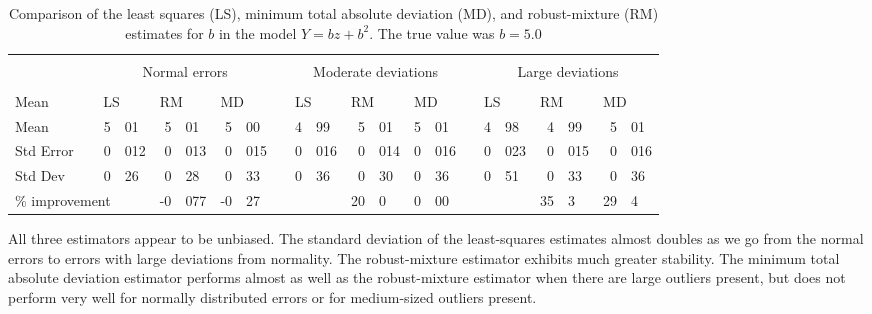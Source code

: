 \documentclass{admbmanual}
\begin{document}
\begin{table}[!h]
  \begin{tabular}{ l   *{3}{ c *{3}{r@{.}l } }     }
    \hline\\[-11pt]
    \hline\\[-9.0pt]
                   &&  \multicolumn{6}{c}{Normal errors}    && \multicolumn{6}{c}{Moderate deviations}    && \multicolumn{6}{c}{Large deviations}  %
                   \\[3pt]
                      \cline{3-8}\cline{10-15}\cline{17-22} \\[-6pt]
    Mean       &&  \multicolumn{2}{l}{LS}  & \multicolumn{2}{l}{RM}  &  \multicolumn{2}{l}{MD}  && \multicolumn{2}{l}{LS}  &\multicolumn{2}{l}{RM}  &  \multicolumn{2}{l}{MD}  && \multicolumn{2}{l}{LS}  & \multicolumn{2}{l}{RM} & \multicolumn{2}{l}{MD}\\
    Mean       &\multicolumn{1}{c}{\qquad}&  5&01 & 5&01 & 5&00    &\multicolumn{1}{c}{\qquad}&   4&99 & 5&01 & 5&01    &\multicolumn{1}{c}{\qquad}&   4&98 & 4&99 & 5&01\\
    Std Error &&  0&012 & 0&013 & 0&015  &&  0&016 & 0&014 & 0&016   &&   0&023 & 0&015 & 0&016\\
    Std Dev  &&  0&26   & 0&28    & 0&33    &&  0&36   & 0&30    & 0&36     &&   0&51   & 0&33   & 0&36\\
   \multicolumn{3}{l}{\% improvement}  & \multicolumn{1}{c}{}  &  -0&077 & -0&27  &&  \multicolumn{2}{c}{}   & 20&0 & 0&00  &&  \multicolumn{2}{c}{}  & 35&3 & 29&4\\[3pt]
   \hline
  \end{tabular}
  \caption{Comparison of the least squares (LS),  minimum total absolute deviation (MD), and robust-mixture (RM) estimates for $b$ in the model \mbox{$Y=bz+b^2$.} The true value was $b=5.0$}
  \label{tab:robust-nonlinear-regression-01}
\end{table}



All three estimators appear to be unbiased. The standard deviation of the 
least-squares estimates almost doubles as we go from the
normal errors to errors with large deviations from normality. 
The robust-mixture estimator exhibits much greater stability. 
The minimum total absolute deviation estimator performs almost as well
as the robust-mixture estimator when there are 
large outliers present,
but does not perform very well for normally distributed errors
or for medium-sized outliers present.
\end{document}
